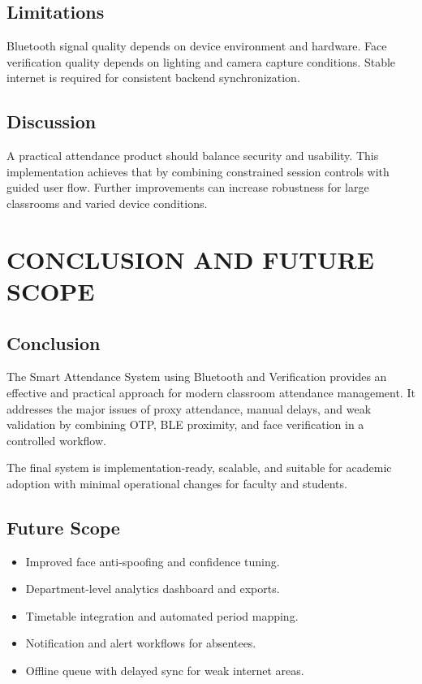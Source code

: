 \documentclass[12pt,a4paper]{report}
\begin{document}
\section{Limitations}
Bluetooth signal quality depends on device environment and hardware. Face verification quality depends on lighting and camera capture conditions. Stable internet is required for consistent backend synchronization.

\section{Discussion}
A practical attendance product should balance security and usability. This implementation achieves that by combining constrained session controls with guided user flow. Further improvements can increase robustness for large classrooms and varied device conditions.

\chapter{CONCLUSION AND FUTURE SCOPE}
\section{Conclusion}
The Smart Attendance System using Bluetooth and Verification provides an effective and practical approach for modern classroom attendance management. It addresses the major issues of proxy attendance, manual delays, and weak validation by combining OTP, BLE proximity, and face verification in a controlled workflow.

The final system is implementation-ready, scalable, and suitable for academic adoption with minimal operational changes for faculty and students.

\section{Future Scope}
\begin{itemize}[leftmargin=1.5cm]
\item Improved face anti-spoofing and confidence tuning.
\item Department-level analytics dashboard and exports.
\item Timetable integration and automated period mapping.
\item Notification and alert workflows for absentees.
\item Offline queue with delayed sync for weak internet areas.
\end{itemize}
\end{document}
